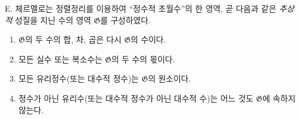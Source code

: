 
E. 체르멜로는 정렬정리를 이용하여 ``정수적 초월수''의 한 영역, 곧 다음과 같은 \emph{추상적} 성질을 지닌 수의 영역 $\mathfrak G$를 구성하였다.
\begin{enumerate}
\item[I.] $\mathfrak G$의 두 수의 합, 차, 곱은 다시 $\mathfrak G$의 수이다.
\item[II.] 모든 실수 또는 복소수는 $\mathfrak G$의 두 수의 몫이다.
\item[III.] 모든 유리정수(또는 대수적 정수)는 $\mathfrak G$의 원소이다.
\item[IV.] 정수가 아닌 유리수(또는 대수적 정수가 아닌 대수적 수)는 어느 것도 $\mathfrak G$에 속하지 않는다.
\end{enumerate}
